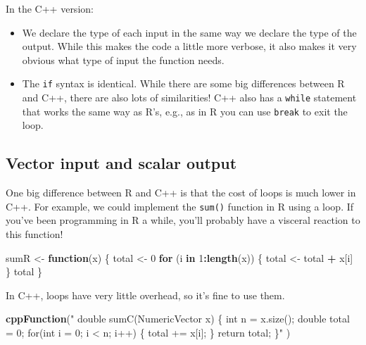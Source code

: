 \documentclass[
]{krantz}
\newenvironment{Shaded}{\begin{snugshade}}{\end{snugshade}}
\newcommand{\ControlFlowTok}[1]{\textcolor[rgb]{0.13,0.29,0.53}{\textbf{#1}}}
\newcommand{\DecValTok}[1]{\textcolor[rgb]{0.00,0.00,0.81}{#1}}
\newcommand{\KeywordTok}[1]{\textcolor[rgb]{0.13,0.29,0.53}{\textbf{#1}}}
\newcommand{\NormalTok}[1]{#1}
\newcommand{\OperatorTok}[1]{\textcolor[rgb]{0.81,0.36,0.00}{\textbf{#1}}}
\newcommand{\StringTok}[1]{\textcolor[rgb]{0.31,0.60,0.02}{#1}}
\begin{document}
In the C++ version:

\begin{itemize}
\item
  We declare the type of each input in the same way we declare the type of the output. While this makes the code a little more verbose, it also makes it very obvious what type of input the function needs.
\item
  The \texttt{if} syntax is identical. While there are some big differences between R and C++, there are also lots of similarities! C++ also has a \texttt{while} statement that works the same way as R's, e.g., as in R you can use \texttt{break} to exit the loop.
\end{itemize}

\hypertarget{vector-input-and-scalar-output}{%
\subsection{Vector input and scalar output}\label{vector-input-and-scalar-output}}

One big difference between R and C++ is that the cost of loops is much lower in C++. For example, we could implement the \texttt{sum()} function in R using a loop. If you've been programming in R a while, you'll probably have a visceral reaction to this function!

\begin{Shaded}
\begin{Highlighting}[]
\NormalTok{sumR \textless{}{-}}\StringTok{ }\ControlFlowTok{function}\NormalTok{(x) \{}
\NormalTok{    total \textless{}{-}}\StringTok{ }\DecValTok{0}
    \ControlFlowTok{for}\NormalTok{ (i }\ControlFlowTok{in} \DecValTok{1}\OperatorTok{:}\KeywordTok{length}\NormalTok{(x)) \{}
\NormalTok{        total \textless{}{-}}\StringTok{ }\NormalTok{total }\OperatorTok{+}\StringTok{ }\NormalTok{x[i]}
\NormalTok{    \}}
\NormalTok{    total}
\NormalTok{\}}
\end{Highlighting}
\end{Shaded}

In C++, loops have very little overhead, so it's fine to use them.

\begin{Shaded}
\begin{Highlighting}[]
\KeywordTok{cppFunction}\NormalTok{(}\StringTok{"}
\StringTok{  double sumC(NumericVector x) \{}
\StringTok{    int n = x.size();}
\StringTok{    double total = 0;}
\StringTok{    for(int i = 0; i \textless{} n; i++) \{}
\StringTok{      total += x[i];}
\StringTok{    \}}
\StringTok{    return total;}
\StringTok{  \}"}
\NormalTok{)}
\end{Highlighting}
\end{Shaded}
\end{document}
